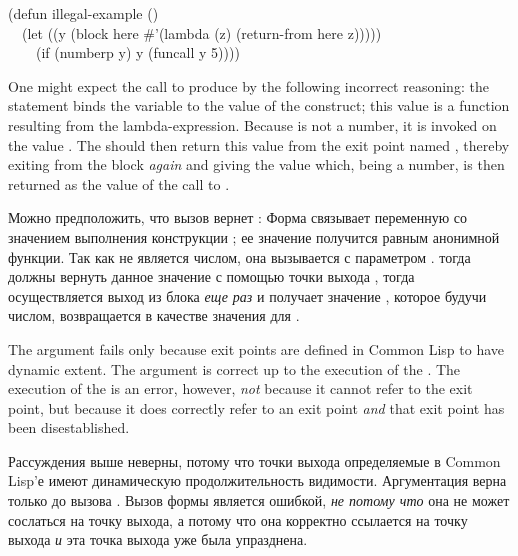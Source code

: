 \begin{lisp}
(defun illegal-example () \\
~~(let ((y (block here \#'(lambda (z) (return-from here z))))) \\
~~~~(if (numberp y) y (funcall y 5))))
\end{lisp}

One might expect the call  to produce 
by the following incorrect reasoning:
the  statement binds the variable  to the
value of the  construct; this value is a function resulting
from the lambda-expression.  Because  is not a number, it is
invoked on the value .  The  should then
return this value from the exit point named , thereby
exiting from the block {\it again} and giving  the value 
which, being a number, is then returned as the value of the call
to .

Можно предположить, что вызов  вернет :
Форма  связывает переменную  со значением выполнения конструкции
; ее значение получится равным анонимной функции. Так как  не
является числом, она вызывается с параметром .  тогда
должны вернуть данное значение с помощью точки выхода , тогда
осуществляется выход из блока {\it еще раз} и  получает значение ,
которое будучи числом, возвращается в качестве значения для .

The argument fails only because exit points are defined in Common Lisp
to have dynamic extent.  The argument is correct up to the execution
of the .  The execution of the  is
an error, however, {\it not} because it cannot refer to the exit point,
but because it does correctly refer to an exit point {\it and}
that exit point has been disestablished.

Рассуждения выше неверны, потому что точки выхода определяемые в
Common Lisp'е имеют динамическую продолжительность видимости. Аргументация верна
только до вызова . Вызов формы  является
ошибкой, {\it не потому что} она не может сослаться на точку выхода, а потому
что она корректно ссылается на точку выхода {\it и} эта точка выхода уже была
упразднена.